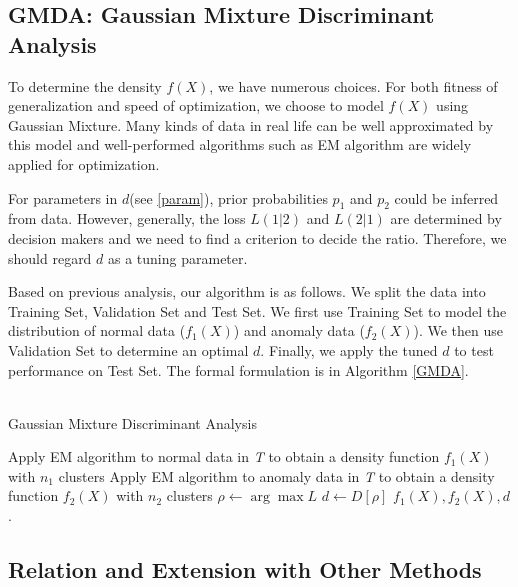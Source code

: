 \documentclass[english]{article}
\begin{document}
\subsection{GMDA: Gaussian Mixture Discriminant Analysis}
\par
To determine the density $f(X)$, we have numerous choices. For both fitness of generalization and speed of optimization, we choose to model $f(X)$ using Gaussian Mixture. Many kinds of data in real life can be well approximated by this model and well-performed algorithms such as EM algorithm are widely applied for optimization.
\par
For parameters in $d$(see \ref{param}), prior probabilities $p_1$ and $p_2$ could be inferred from data. However, generally, the loss $L(1|2)$ and $L(2|1)$ are determined by decision makers and we need to find a criterion to decide the ratio. Therefore, we should regard $d$ as a tuning parameter. 
\par
Based on previous analysis, our algorithm is as follows. We split the data into Training Set, Validation Set and Test Set. We first use Training Set to model the distribution of normal data ($f_1(X)$) and anomaly data ($f_2(X)$). We then use Validation Set to determine an optimal $d$. Finally, we apply the tuned $d$ to test performance on Test Set. The formal formulation is in Algorithm \ref{GMDA}.
\\\\
\begin{algorithm}[H]
\label{GMDA}
\caption{Gaussian Mixture Discriminant Analysis}
\SetAlgoLined
		Apply EM algorithm to normal data in \textit{T} to obtain a density function $f_1(X)$ with $n_1$ clusters\;
		Apply EM algorithm to anomaly data in \textit{T} to obtain a density function $f_2(X)$ with $n_2$ clusters\;
		$\rho \gets \arg\max L$\; 
		$d\gets D[\rho]$\;
		\Return $f_1(X), f_2(X), d$.
\end{algorithm}
 
\subsection{Relation and Extension with Other Methods}
\end{document}
